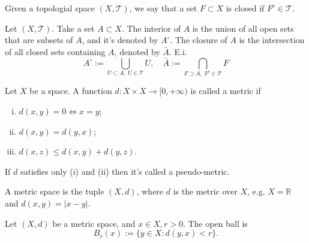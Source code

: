\begin{definition}
	Given a topologial space $(X, \mathcal T)$, we say that a set $F \subset X$ is closed
	if $F^c \in \mathcal T$.
\end{definition}

\begin{definition}
	Let $(X, \mathcal T)$. Take a set $A \subset X$. The interior of $A$ is
	the union of all open sets that are subsets of $A$, and it's denoted by
	$A^{\circ}$. The closure of $A$ is the intersection of all closed sets containing
	$A$, denoted by $\bar A$. E.i.
	\begin{equation}
		A^{\circ} := \bigcup_{
			U \subset A , \ U \in \mathcal T
		} U,\quad
		\bar A:= \bigcap_{
			F \supset A , \ F^c \in \mathcal T
		} F
	\end{equation}
\end{definition}

\begin{definition}[Metric]
	Let $X$ be a space. A function $d:X\times X \to \mathbb [0,+\infty)$ is called a metric if
	\begin{enumerate}[(i)]
		\item $d(x,y) = 0 \iff x =y$;
		\item $d(x,y) = d(y,x)$;
		\item $d(x,z) \leq d(x,y) + d(y,z)$.
	\end{enumerate}
	If $d$ satisfies only (i) and (ii) then it's called a pseudo-metric.
\end{definition}

\begin{definition}
	A metric space is the tuple $(X,d)$, where $d$ is the metric over $X$,
	e.g. $X=\mathbb R$ and $d(x,y) = |x-y|$.
\end{definition}

\begin{definition}
	Let $(X,d)$ be a metric space, and $x \in X, r >0$. The open ball is
	\begin{equation}
		B_r(x):= \{y \in X: d(y,x) < r\}.
	\end{equation}
\end{definition}

